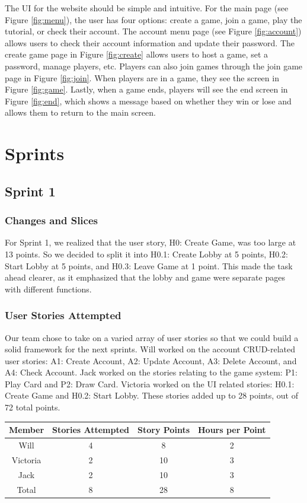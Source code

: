 \documentclass{article}
\begin{document}
The UI for the website should be simple and intuitive. For the main page (see Figure \ref{fig:menu}), the user has four options: create a game, join a game, play the tutorial, or check their account. The account menu page (see Figure \ref{fig:account}) allows users to check their account information and update their password. The create game page in Figure \ref{fig:create} allows users to host a game, set a password, manage players, etc. Players can also join games through the join game page in Figure \ref{fig:join}. When players are in a game, they see the screen in Figure \ref{fig:game}. Lastly, when a game ends, players will see the end screen in Figure \ref{fig:end}, which shows a message based on whether they win or lose and allows them to return to the main screen.

\section{Sprints}

\subsection{Sprint 1}

\subsubsection{Changes and Slices}
For Sprint 1, we realized that the user story, H0: Create Game, was too large at 13 points. So we decided to split it into H0.1: Create Lobby at 5 points, H0.2: Start Lobby at 5 points, and H0.3: Leave Game at 1 point. This made the task ahead clearer, as it emphasized that the lobby and game were separate pages with different functions.

\subsubsection{User Stories Attempted}
Our team chose to take on a varied array of user stories so that we could build a solid framework for the next sprints. Will worked on the account CRUD-related user stories: A1: Create Account, A2: Update Account, A3: Delete Account, and A4: Check Account. Jack worked on the stories relating to the game system: P1: Play Card and P2: Draw Card. Victoria worked on the UI related stories: H0.1: Create Game and H0.2: Start Lobby. These stories added up to 28 points, out of 72 total points.

\begin{table}[h]
\centering
\begin{tabular}{|c|c|c|c|}
\hline
\textbf{Member} & \textbf{Stories Attempted} & \textbf{Story Points} & \textbf{Hours per Point} \\ \hline
Will     & 4 & 8  & 2 \\ \hline
Victoria & 2 & 10 & 3 \\ \hline
Jack     & 2 & 10 & 3 \\ \hline
Total    & 8 & 28 & 8 \\ \hline
\end{tabular}
\end{table}
\end{document}
